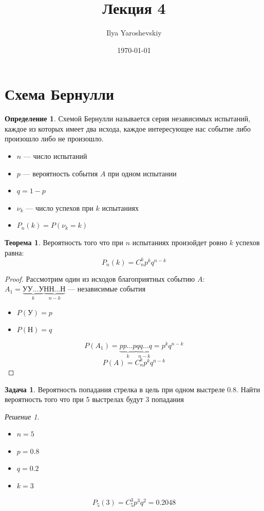 \documentclass[english]{article}
\author{Ilya Yaroshevskiy}
\date{\today}
\title{Лекция 4}
\theoremstyle{plain}
\theoremstyle{remark}
\newtheorem*{solution}{Решение}
\theoremstyle{definition}
\newtheorem{task}{Задача}
\newtheorem{theorem}{Теорема}[section]
\newtheorem*{definition}{Определение}
\begin{document}
\maketitle
\tableofcontents


\section{Схема Бернулли}
\label{sec:org0866c17}
\begin{definition}
Схемой Бернулли называется серия независимых испытаний, каждое из
которых имеет два исхода, каждое интересующее нас событие либо
произошло либо не произошло.
\begin{itemize}
\item \(n\) --- число испытаний
\item \(p\) --- вероятность события \(A\) при одном испытании
\item \(q = 1 - p\)
\item \(\nu_k\) --- число успехов при \(k\) испытаниях
\item \(P_n(k) = P(\nu_k = k)\)
\end{itemize}
\end{definition}
\begin{theorem}
Вероятность того что при \(n\) испытаниях произойдет ровно \(k\) успехов равна:
\[ P_n(k) = C^k_np^kq^{n - k} \]
\end{theorem}
\begin{proof}
Рассмотрим один из исходов благоприятных событию \(A\): \(A_1 = \underbrace{\text{УУ}\dots\text{У}}_k\underbrace{\text{НН}\dots\text{Н}}_{n - k}\) --- независимые события \\
\begin{itemize}
\item \(P(\text{У}) = p\)
\item \(P(\text{Н}) = q\)
\end{itemize}
\[ P(A_1) = \underbrace{pp\dots p}_k\underbrace{qq\dots q}_{n - k} = p^kq^{n - k} \]
\[ P(A) = C^k_np^kq^{n - k} \]
\end{proof}
\begin{task}
Вероятность попадания стрелка в цель при одном выстреле 0.8. Найти
вероятность того что при 5 выстрелах будут 3 попадания
\end{task}
\begin{solution}
\-
\begin{itemize}
\item \(n = 5\)
\item \(p = 0.8\)
\item \(q = 0.2\)
\item \(k = 3\)
\end{itemize}
\[ P_5(3) = C^3_5 p^3q^2 = 0.2048\]
\end{solution}
\end{document}
